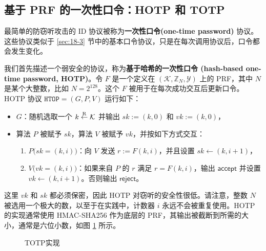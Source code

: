 \subsection{基于 PRF 的一次性口令：HOTP 和 TOTP}\label{subsec:18-5-1}

最简单的防窃听攻击的 ID 协议被称为\textbf{一次性口令(one-time password)} 协议。这些协议类似于 \ref{sec:18-3} 节中的基本口令协议，只是在每次调用协议后，口令都会发生变化。

我们首先描述一个弱安全的协议，称为\textbf{基于哈希的一次性口令 (hash-based one-time password, HOTP)}。令 $F$ 是一个定义在 $(\mathcal{K},\mathbb{Z}_N,\mathcal{Y})$ 上的 PRF，其中 $N$ 是某个大整数，比如 $N=2^{128}$。这个 $F$ 被用于在每次成功交互后更新口令。HOTP 协议 $\mathtt{HTOP}=(G,P,V)$ 运行如下：
\begin{itemize}
	\item $G$：随机选取一个 $k\overset{\rm R}\leftarrow\mathcal{K}$ 并输出 $sk:=(k,0)$ 和 $vk:=(k,0)$，
	\item 算法 $P$ 被赋予 $sk$，算法 $V$ 被赋予 $vk$，并按如下方式交互：
	\begin{enumerate}
		\item $P\big(sk=(k,i)\big)$：向 $V$ 发送 $r:=F(k,i)$，并且设置 $sk\leftarrow (k,i+1)$，
		\item $V\big(vk=(k,i)\big)$：如果来自 $P$ 的 $r$ 满足 $r=F(k,i)$，输出 $\mathsf{accept}$ 并设置 $vk\leftarrow(k,i+1)$。否则输出 $\mathsf{reject}$。
	\end{enumerate}
\end{itemize}
这里 $vk$ 和 $sk$ 都必须保密，因此 HOTP 对窃听的安全性很低。请注意，整数 $N$ 被选用一个极大的数，以至于在实践中，计数器 $i$ 永远不会被重复使用。HOTP 的实现通常使用 HMAC-SHA256 作为底层的 PRF，其输出被截断到所需的大小，通常是六位小数，如图 \ref{fig:18-8} 所示。

\begin{figure}
  \centering
  \qquad\qquad\qquad\qquad
  \caption{TOTP实现}
  \label{fig:18-8}
\end{figure}

